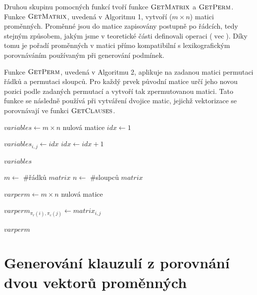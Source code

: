 Druhou skupinu pomocných funkcí tvoří funkce $\textproc{GetMatrix}$ a $\textproc{GetPerm}$. Funkce $\textproc{GetMatrix}$, uvedená v Algoritmu 1, vytvoří ($m \times n$) matici proměnných. Proměnné jsou do matice zapisovány postupně po řádcích, tedy stejným způsobem, jakým jsme v teoretické části definovali operaci ($\operatorname{vec}$). Díky tomu je pořadí proměnných v matici přímo kompatibilní s lexikografickým porovnáváním používaným při generování  podmínek.

Funkce $\textproc{GetPerm}$, uvedená v Algoritmu 2, aplikuje na zadanou matici permutaci řádků a permutaci sloupců. Pro každý prvek původní matice určí jeho novou pozici podle zadaných permutací a vytvoří tak zpermutovanou matici. Tato funkce se následně používá při vytváření dvojice matic, jejichž vektorizace se porovnávají ve funkci $\textproc{GetClauses}$.


\begin{algorithm}[H]
\begin{algorithmic}[1]
    	\State $variables \gets m\times n$ nulová matice
    	\State $idx \gets 1$
    
            		\State $variables_{i,j} \gets idx$
            		\State $idx \gets idx + 1$
        	\EndFor
    	\EndFor
    
    	\State \Return $variables$
\EndFunction
\end{algorithmic}
\caption{Vytvoření matice proměnných}
\end{algorithm}



\begin{algorithm}[H]
\begin{algorithmic}[1]
    	\State $m \gets$ \#řádků $matrix$
    	\State $n \gets$ \#sloupců $matrix$
    
    	\State $varperm \gets m\times n$ nulová matice 
    
            		\State $varperm_{\pi_r(i),\pi_c(j)} \gets matrix_{i,j}$
        	\EndFor
    	\EndFor
    
    	\State \Return $varperm$
\EndFunction
\end{algorithmic}
\caption{Aplikace permutací na matici}
\end{algorithm}

\section{Generování klauzulí z porovnání dvou vektorů proměnných}

